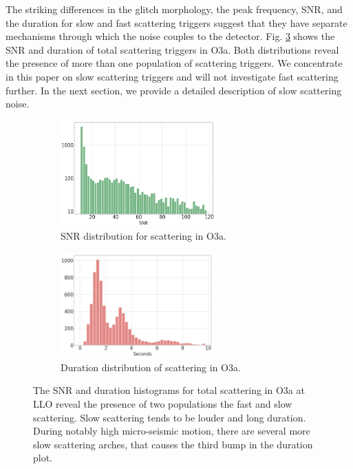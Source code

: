 \documentclass[12pt]{iopart}
\begin{document}
 The striking differences in the glitch morphology, the peak frequency, SNR, and the duration for slow and fast scattering triggers suggest that they have separate mechanisms through which the noise couples to the detector. Fig. \ref{fig:snrdur} shows the SNR and duration of total scattering triggers in O3a. Both distributions reveal the presence of more than one population of scattering triggers. We concentrate in this paper on slow scattering triggers and will not investigate fast scattering further. In the next section, we provide a detailed description of slow scattering noise.
\begin{figure}[h]
\captionsetup[subfigure]{font=scriptsize,labelfont=scriptsize}
   \centering
    \begin{subfigure}[b]{0.45\textwidth}
        \centering
         \includegraphics[width= 6cm]{histsnr4d.png}
         \caption{SNR distribution for scattering in O3a.}
         \label{fig:histsnr}
    \end{subfigure}
    \hfill
    \begin{subfigure}[b]{0.5\textwidth}
        \centering
         \includegraphics[width =6cm]{histdur4c.png}
         \caption{ Duration distribution of scattering in O3a.}
         \label{fig:histdur}
         
    
    \end{subfigure}
    \caption{The SNR and duration histograms for total scattering in O3a at LLO reveal the presence of two populations the fast and slow scattering. Slow scattering tends to be louder and long duration. During notably high micro-seismic motion, there are several more slow scattering arches, that causes the third bump in the duration plot.}
    \label{fig:snrdur}
    
\end{figure}
\end{document}
